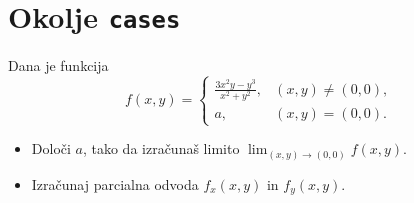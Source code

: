 \documentclass[a4paper,12pt]{article}
\begin{document}
\section*{Okolje \texttt{cases}}
Dana je funkcija
   \[
f(x,y)=
\begin{cases}
\frac{3x^2y-y^3}{x^2+y^2}, & (x,y)\neq(0,0),\\
a, & (x,y)=(0,0).
\end{cases}
\]
\begin{itemize}
\item Določi \(a\), tako da izračunaš limito \( \lim_{(x,y)\to(0,0)} f(x,y) \).
\item Izračunaj parcialna odvoda \(f_x(x,y)\) in \(f_y(x,y)\).
\end{itemize}
\end{document}
